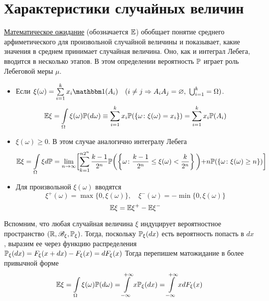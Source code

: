 \section{Характеристики случайных величин}

\underline{Математическое ожидание} (обозначается $\mathbb{E}$) обобщает понятие среднего арфиметического для произвольной случайной величины и показывает, какие значения в среднем принимает случайная величина. Оно, как и интеграл Лебега, вводится в несколько этапов. В этом определении вероятность $\mathbb{P}$ играет роль
Лебеговой меры $\mu$.

\begin{itemize}
 	\item Если $\xi(\omega) = \sum\limits_{i=1}^kx_i \Ind(A_i) \quad (i \not= j \Rightarrow A_iA_j = \varnothing, \ \bigcup_{i=1}^k = \Omega)$. 
 	$$\mathbb{E} \xi = \int\limits_{\Omega} \xi(\omega) \mathbb{P}(d\omega) \equiv \sum\limits_{i=1}^k x_i \mathbb{P}(\left\{ \omega \colon \xi(\omega)=x_i \right\}) =  \sum\limits_{i=1}^k x_i \mathbb{P}(A_i)$$
	\item $\xi(\omega) \ge 0$. В этом случае аналогично интегралу Лебега
	$$ \mathbb{E} \xi = \int\limits_{\Omega} \xi d\mathbb{P} = \lim_{n \to \infty}  \biggl[  \sum\limits_{k=1}^{n2^n} \frac{k-1}{2^n} \mathbb{P}\biggl(\left\{ \omega \colon \frac{k-1}{2^n} \le \xi(\omega) < \frac{k}{2^n} \right\}\biggl) 
	+ n \mathbb{P}(\left\{ \omega \colon \xi(\omega) \ge n \right\})\biggl]$$
	\item Для произвольной $\xi(\omega)$ вводятся
	$$ \xi^+(\omega) = \max\{0, \xi(\omega)\},\quad \xi^-(\omega) = -\min\{0, \xi(\omega)\}$$
	$$ \mathbb{E} \xi = \mathbb{E} \xi^+ - \mathbb{E} \xi^-$$
\end{itemize}

Вспомним, что любая случайная величина $\xi$ индуцирует вероятностное пространство $(\mathbb{R}, \mathscr{B}_\xi, \mathbb{P}_\xi)$. Тогда, поскольку $\mathbb{P}_\xi(dx)$ есть вероятность попасть
в $dx$, выразим ее через функцию распределения $\mathbb{P}_\xi(dx) = F_\xi(x + dx) - F_\xi(x) = dF_\xi(x)$ Тогда перепишем матожидание в более привычной форме
$$\mathbb{E}\xi = \int\limits_{\Omega} \xi(\omega) \mathbb{P}(d\omega) = \int\limits_{-\infty}^{+\infty} x \mathbb{P}_\xi(dx) = \int\limits_{-\infty}^{+\infty} x dF_\xi(x)$$

